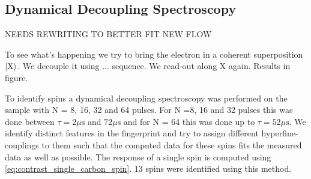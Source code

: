 \subsection{Dynamical Decoupling Spectroscopy}

NEEDS REWRITING TO BETTER FIT NEW FLOW

To see what's happening we try to bring the electron in a coherent superposition ${\left\vert{\mathrm{X}}\right\rangle}$.
We decouple it using ... sequence. We read-out along X again. Results in figure.

To identify spins a dynamical decoupling spectroscopy was performed on the sample with N = 8, 16, 32 and 64 pulses. For N =8, 16 and 32 pulses this was done between $\tau = 2 \mu \mathrm{s}$  and $72 \mu \mathrm{s}$ and for N = 64 this was done up to $\tau = 52 \mu \mathrm{s}$.
We identify distinct features in the fingerprint and try to assign different hyperfine-couplings to them such that the computed data for these spins fits the measured data as well as possible.
The response of a single spin is computed using \cref{eq:contrast_single_carbon_spin}.
13 spins were identified using this method.


